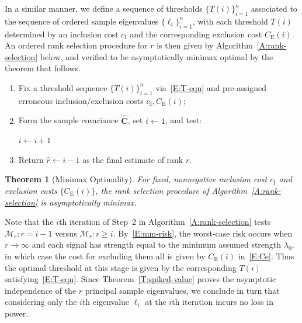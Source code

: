 \documentclass[final]{IEEEtran} %
\newtheorem{theorem}{Theorem}
\newcommand{\matrixsymbol}{\boldsymbol}
\newcommand{\mhC}{\widehat{\matrixsymbol{C}}}
\newcommand{\ulambda}{\lambda_0}
\newcommand{\Ce}{C_\text{E}}
\newcommand{\ci}{c_\text{I}}
\begin{document}
In a similar manner, we define a sequence of thresholds $\{T(i)\}_{i=1}^n$ associated to the sequence of ordered sample eigenvalues $\{\ell_i\}_{i=1}^n$, with each threshold $T(i)$ determined by an inclusion cost $\ci$ and the corresponding exclusion cost $\Ce(i)$.  An ordered rank selection procedure for $r$ is then given by Algorithm~\ref{A:rank-selection} below, and verified to be asymptotically minimax optimal by the theorem that follows.
\begin{algorithm}
\caption{\label{A:rank-selection}Minimax-optimal rank selection procedure}
\begin{enumerate}
\item Fix a threshold sequence $\{T(i)\}_{i=1}^n$ via~\eqref{E:T-eqn} and pre-assigned erroneous inclusion/exclusion costs $\ci, \Ce(i)$;
\item Form the sample covariance $\mhC$, set $i \leftarrow 1$, and test:

    \begin{algorithmic}
    \WHILE{ $\ell_{i}(\mhC) > T( i )$ }
        \STATE $i \leftarrow i + 1$
    \ENDWHILE
\end{algorithmic}
\item Return $\hat r \leftarrow i - 1$ as the final estimate of rank $r$.
\end{enumerate}
\end{algorithm}%

\begin{theorem}[Minimax Optimality]\label{T:mm-opt} For fixed, nonnegative inclusion cost $\ci$ and exclusion
costs $\{\Ce(i)\}$, the rank selection procedure of Algorithm~\ref{A:rank-selection} is asymptotically minimax.
\end{theorem}

\begin{IEEEproof}
Note that the $i$th iteration of Step~2 in Algorithm~\ref{A:rank-selection} tests $\mathcal{M}_r: r = i-1$ versus $\mathcal{M}_r: r \geq i$.  By~\eqref{E:mm-risk}, the worst-case risk occurs when $r \to \infty$ and each signal has strength equal to the minimum assumed strength $\ulambda$, in which case the cost for excluding them all is given by $\Ce(i)$ in~\eqref{E:Ce}. Thus the optimal threshold at this stage is given by the corresponding $T(i)$ satisfying~\eqref{E:T-eqn}.  Since Theorem~\ref{T:spiked-value} proves the asymptotic independence of the $r$ principal sample eigenvalues, we conclude in turn that considering only the $i$th eigenvalue $\ell_i$ at the $i$th iteration incurs no loss in power.
\end{IEEEproof}
\end{document}
